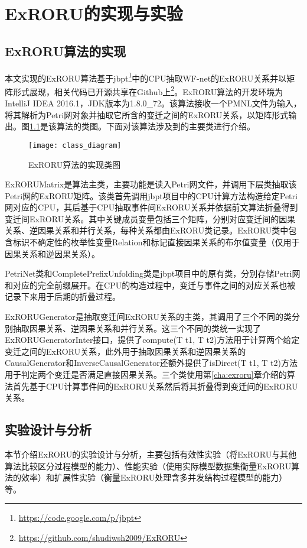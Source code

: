 
\chapter{ExRORU的实现与实验}\label{cha:experiment}

\section{ExRORU算法的实现}\label{sec:implementation}
本文实现的ExRORU算法基于jbpt\footnote{\url{https://code.google.com/p/jbpt}}中的CPU抽取WF-net的ExRORU关系并以矩阵形式展现，相关代码已开源共享在Github上\footnote{\url{https://github.com/shudiwsh2009/ExRORU}}。ExRORU算法的开发环境为IntelliJ IDEA 2016.1，JDK版本为1.8.0\_72。该算法接收一个PMNL文件为输入，将其解析为Petri网对象并抽取它所含的变迁之间的ExRORU关系，以矩阵形式输出。图\ref{fig:class_diagram}是该算法的类图。下面对该算法涉及到的主要类进行介绍。

\begin{figure}[htbp]
  \centering
  \texttt{[image: class\_diagram]}
  \caption{ExRORU算法的实现类图}
  \label{fig:class_diagram}
\end{figure}

ExRORUMatrix是算法主类，主要功能是读入Petri网文件，并调用下层类抽取该Petri网的ExRORU矩阵。该类首先调用jbpt项目中的CPU计算方法构造给定Petri网对应的CPU，其后基于CPU抽取事件间ExRORU关系并依据前文算法折叠得到变迁间ExRORU关系。其中关键成员变量包括三个矩阵，分别对应变迁间的因果关系、逆因果关系和并行关系，每种关系都由ExRORU类记录。ExRORU类中包含标识不确定性的枚举性变量Relation和标记直接因果关系的布尔值变量（仅用于因果关系和逆因果关系）。

PetriNet类和CompletePrefixUnfolding类是jbpt项目中的原有类，分别存储Petri网和对应的完全前缀展开。在CPU的构造过程中，变迁与事件之间的对应关系也被记录下来用于后期的折叠过程。

ExRORUGenerator是抽取变迁间ExRORU关系的主类，其调用了三个不同的类分别抽取因果关系、逆因果关系和并行关系。这三个不同的类统一实现了ExRORUGeneratorInter接口，提供了compute(T t1, T t2)方法用于计算两个给定变迁之间的ExRORU关系，此外用于抽取因果关系和逆因果关系的CausalGenerator和InverseCausalGenerator还额外提供了isDirect(T t1, T t2)方法用于判定两个变迁是否满足直接因果关系。三个类使用第\ref{cha:exroru}章介绍的算法首先基于CPU计算事件间的ExRORU关系然后将其折叠得到变迁间的ExRORU关系。

\section{实验设计与分析}\label{sec:experiment}
本节介绍ExRORU的实验设计与分析，主要包括有效性实验（将ExRORU与其他算法比较区分过程模型的能力）、性能实验（使用实际模型数据集衡量ExRORU算法的效率）和扩展性实验（衡量ExRORU处理含多并发结构过程模型的能力）等。

